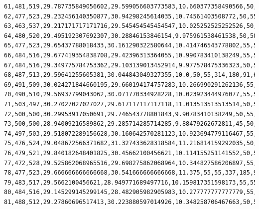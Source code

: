 \documentclass[authoryearcitations]{UoYCSproject}
\begin{document}
\begin{landscape}
\begin{verbatim}
61,481,519,29.787735849056602,29.599056603773583,10.660377358490566,50,55,289,199,102,72,57,55,37,26,48,24,26,24,16,16,6,2,0,1,0
62,477,523,29.232456140350877,30.94298245614035,10.74561403508772,50,55,315,164,124,63,59,61,44,29,29,40,19,17,16,12,6,1,0,1,0
63,463,537,29.217171717171716,29.545454545454547,10.025252525252526,50,50,278,198,101,80,57,58,51,37,31,29,26,17,18,9,5,4,1,0,0
64,480,520,29.495192307692307,30.28846153846154,9.975961538461538,50,50,287,182,92,72,70,48,53,51,28,29,25,20,13,15,10,4,1,0,0
65,477,523,29.65437788018433,30.161290322580644,10.414746543778802,55,55,287,203,92,54,66,58,45,47,39,22,29,22,11,12,7,5,0,1,0
66,484,516,29.677419354838708,29.42396313364055,10.990783410138249,55,50,293,201,83,72,51,63,48,39,32,36,17,26,17,9,8,4,1,0,0
67,484,516,29.349775784753362,29.103139013452914,9.977578475336323,50,50,313,172,95,65,58,53,62,36,38,32,27,13,15,9,7,3,1,1,0
68,487,513,29.59641255605381,30.044843049327355,10.0,50,55,314,180,91,66,56,50,53,60,29,34,22,16,13,5,8,2,0,1,0
69,491,509,30.024271844660195,29.660194174757283,10.266990291262136,55,50,291,195,88,70,63,53,44,42,54,26,29,13,14,10,5,2,1,0,0
70,490,510,29.56937799043062,30.071770334928228,10.023923444976077,55,50,292,173,113,64,59,61,51,32,44,35,27,18,14,9,6,1,1,0,0
71,503,497,30.27027027027027,29.617117117117118,11.013513513513514,50,55,307,171,98,73,56,58,45,44,26,40,25,26,10,12,5,2,1,1,0
72,500,500,30.29953917050691,29.746543778801843,9.90783410138249,50,55,303,182,98,63,58,51,60,45,29,22,36,22,15,9,5,0,2,0,0
73,500,500,28.94009216589862,29.285714285714285,9.88479262672811,45,50,297,196,94,66,53,56,45,50,42,24,19,24,15,10,7,0,1,1,0
74,497,503,29.518072289156628,30.160642570281123,10.923694779116467,55,50,342,176,88,55,55,56,50,35,44,28,18,19,13,12,5,2,1,1,0
75,476,524,29.048672566371682,31.327433628318584,11.216814159292035,50,55,324,197,92,58,51,44,54,37,35,37,19,24,5,12,7,1,2,1,0
76,479,521,29.840182648401825,30.45662100456621,10.114155251141552,50,55,310,195,110,58,52,46,45,45,34,29,24,17,14,8,8,3,1,1,0
77,472,528,29.525862068965516,29.698275862068964,10.344827586206897,55,50,322,189,102,66,50,44,43,43,34,28,25,20,13,7,7,5,1,1,0
78,477,523,29.666666666666668,30.541666666666668,11.375,55,55,337,185,91,77,56,40,47,30,39,27,23,17,13,9,4,3,2,0,0
79,483,517,29.5662100456621,28.949771689497716,10.159817351598173,55,55,311,203,102,61,71,48,35,39,33,25,22,19,14,7,5,4,0,1,0
80,484,516,29.145299145299145,28.482905982905983,10.277777777777779,55,50,331,174,114,59,54,61,47,28,27,31,25,16,16,8,5,2,1,1,0
81,488,512,29.27860696517413,30.223880597014926,10.348258706467663,50,50,292,193,109,72,53,58,47,48,20,25,30,19,17,8,6,0,3,0,0

\end{verbatim}
\end{landscape}
\end{document}
